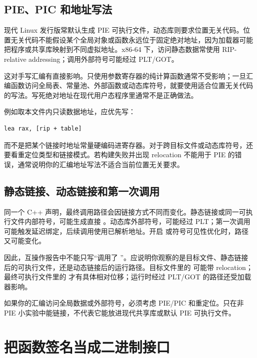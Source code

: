 \subsection{PIE、PIC 和地址写法}

现代 Linux 发行版常默认生成 PIE 可执行文件，动态库则要求位置无关代码。位置无关代码不能假设某个全局对象或函数永远位于固定绝对地址，因为加载器可能把程序或共享库映射到不同虚拟地址。x86-64 下，访问静态数据常使用 RIP-relative addressing；调用外部符号可能经过 PLT/GOT。

这对手写汇编有直接影响。只使用参数寄存器的纯计算函数通常不受影响；一旦汇编函数访问全局表、常量池、外部函数或动态库符号，就要使用适合位置无关代码的写法。写死绝对地址在现代用户态程序里通常不是正确做法。

例如取本文件内只读数据地址，应优先写：

\begin{lstlisting}
lea rax, [rip + table]
\end{lstlisting}

而不是把某个链接时地址常量硬编码进寄存器。对于跨目标文件或动态库符号，还要看重定位类型和链接模式。若构建失败并出现 relocation 不能用于 PIE 的错误，通常说明你的汇编地址写法不适合当前位置无关要求。

\subsection{静态链接、动态链接和第一次调用}

同一个 C++ 声明，最终调用路径会因链接方式不同而变化。静态链接或同一可执行文件内部符号，可能生成直接 。动态库外部符号，可能经过 PLT；第一次调用可能触发延迟绑定，后续调用使用已解析地址。开启  或符号可见性优化时，路径又可能变化。

因此，互操作报告中不能只写“调用了 ”。应说明你观察的是目标文件、静态链接后的可执行文件，还是动态链接后的运行路径。目标文件里的  可能带 relocation；最终可执行文件里的  才有具体相对位移；运行时经过 PLT/GOT 的路径还受加载器影响。

\begin{warningbox}
如果你的汇编访问全局数据或外部符号，必须考虑 PIE/PIC 和重定位。只在非 PIE 小实验中能链接，不代表它能放进现代共享库或默认 PIE 可执行文件。
\end{warningbox}

\section{把函数签名当成二进制接口}

